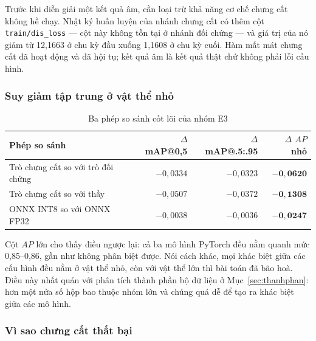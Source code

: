 Trước khi diễn giải một kết quả âm, cần loại trừ khả năng cơ chế chưng cất không hề chạy. Nhật ký
huấn luyện của nhánh chưng cất có thêm cột \texttt{train/dis\_loss} --- cột này không tồn tại ở
nhánh đối chứng --- và giá trị của nó giảm từ 12,1663 ở chu kỳ đầu xuống 1,1608 ở chu kỳ cuối. Hàm
mất mát chưng cất đã hoạt động và đã hội tụ; kết quả âm là kết quả thật chứ không phải lỗi cấu hình.

\subsubsection*{Suy giảm tập trung ở vật thể nhỏ}

\begin{table}[H]
\centering
\caption{Ba phép so sánh cốt lõi của nhóm E3}
\label{tab:e3_delta}
\small
\begin{tabular}{lrrr}
\toprule
\textbf{Phép so sánh} & \textbf{$\Delta$ mAP@0,5} & \textbf{$\Delta$ mAP@.5:.95} & \textbf{$\Delta$ $AP$ nhỏ} \\
\midrule
Trò chưng cất so với trò đối chứng & $-0{,}0334$ & $-0{,}0323$ & $\mathbf{-0{,}0620}$ \\
Trò chưng cất so với thầy          & $-0{,}0507$ & $-0{,}0372$ & $\mathbf{-0{,}1308}$ \\
ONNX INT8 so với ONNX FP32         & $-0{,}0038$ & $-0{,}0036$ & $\mathbf{-0{,}0247}$ \\
\bottomrule
\end{tabular}
\end{table}


Cột $AP$ lớn cho thấy điều ngược lại: cả ba mô hình PyTorch đều nằm quanh mức 0,85--0,86, gần như
không phân biệt được. Nói cách khác, mọi khác biệt giữa các cấu hình đều nằm ở vật thể nhỏ, còn với
vật thể lớn thì bài toán đã bão hoà. Điều này nhất quán với phân tích thành phần bộ dữ liệu ở
Mục~\ref{sec:thanhphan}: hơn một nửa số hộp bao thuộc nhóm lớn và chúng quá dễ để tạo ra khác biệt
giữa các mô hình.

\subsubsection*{Vì sao chưng cất thất bại}

